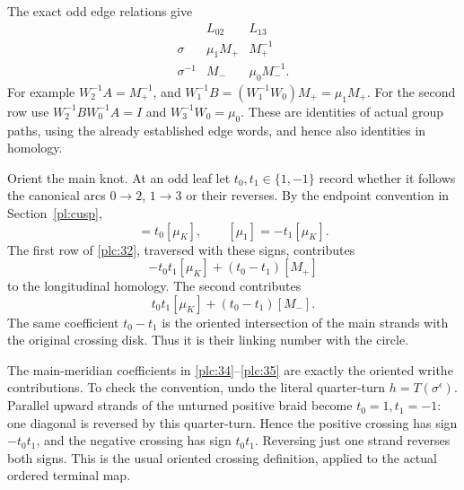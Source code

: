 The exact odd edge relations give \begin{equation}
\begin{array}{c|cc}
 &L_{02}&L_{13}\\ \hline
\sigma&\mu_1M_+&M_+^{-1}\\
\sigma^{-1}&M_-&\mu_0M_-^{-1}.
\end{array}
\label{plc:32}
\end{equation} For example \(W_2^{-1}A=M_+^{-1}\), and
\(W_1^{-1}B=(W_1^{-1}W_0)M_+=\mu_1M_+\). For the second row use
\(W_2^{-1}BW_0^{-1}A=I\) and \(W_3^{-1}W_0=\mu_0\). These are identities
of actual group paths, using the already established edge words, and
hence also identities in homology.

Orient the main knot. At an odd leaf let \(t_0,t_1\in\{1,-1\}\) record
whether it follows the canonical arcs \(0\to2\), \(1\to3\) or their
reverses. By the endpoint convention in Section~\ref{pl:cusp}, \begin{equation}
[\mu_0]=t_0[\mu_K],\qquad
                        [\mu_1]=-t_1[\mu_K].
\label{plc:33}
\end{equation} The first row of \eqref{plc:32}, traversed with these signs, contributes \begin{equation}
-t_0t_1[\mu_K]+(t_0-t_1)[M_+]
\label{plc:34}
\end{equation} to the longitudinal homology. The second contributes \begin{equation}
t_0t_1[\mu_K]+(t_0-t_1)[M_-].
\label{plc:35}
\end{equation} The same coefficient \(t_0-t_1\) is the oriented intersection of the
main strands with the original crossing disk. Thus it is their linking
number with the circle.

The main-meridian coefficients in \eqref{plc:34}--\eqref{plc:35} are exactly the oriented
writhe contributions. To check the convention, undo the literal
quarter-turn \(h=T(\sigma^\epsilon)\). Parallel upward strands of the
unturned positive braid become \(t_0=1,t_1=-1\): one diagonal is
reversed by this quarter-turn. Hence the positive crossing has sign
\(-t_0t_1\), and the negative crossing has sign \(t_0t_1\). Reversing
just one strand reverses both signs. This is the usual oriented crossing
definition, applied to the actual ordered terminal map.

